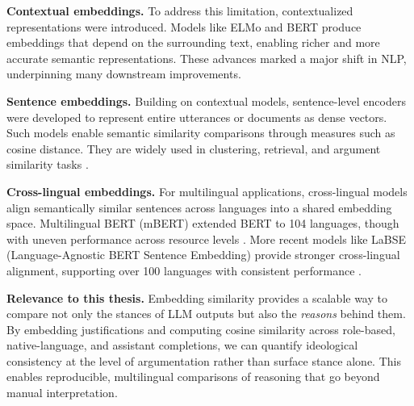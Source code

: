 \textbf{Contextual embeddings.} To address this limitation, contextualized representations were introduced. Models like ELMo \parencite{peters2018elmo} and BERT \parencite{devlin2019bert} produce embeddings that depend on the surrounding text, enabling richer and more accurate semantic representations. These advances marked a major shift in NLP, underpinning many downstream improvements.  

\textbf{Sentence embeddings.} Building on contextual models, sentence-level encoders were developed to represent entire utterances or documents as dense vectors. Such models enable semantic similarity comparisons through measures such as cosine distance. They are widely used in clustering, retrieval, and argument similarity tasks \parencite{reimers2019sbert}.  

\textbf{Cross-lingual embeddings.} For multilingual applications, cross-lingual models align semantically similar sentences across languages into a shared embedding space. Multilingual BERT (mBERT) extended BERT to 104 languages, though with uneven performance across resource levels \parencite{devlin2019bert}. More recent models like LaBSE (Language-Agnostic BERT Sentence Embedding) provide stronger cross-lingual alignment, supporting over 100 languages with consistent performance \parencite{feng2020labse}.  

\textbf{Relevance to this thesis.} Embedding similarity provides a scalable way to compare not only the stances of LLM outputs but also the \emph{reasons} behind them. By embedding justifications and computing cosine similarity across role-based, native-language, and assistant completions, we can quantify ideological consistency at the level of argumentation rather than surface stance alone. This enables reproducible, multilingual comparisons of reasoning that go beyond manual interpretation.
